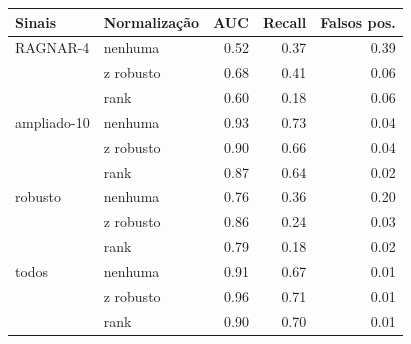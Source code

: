 \begin{tabular}{llrrr}
\toprule
Sinais & Normalização & AUC & Recall & Falsos pos. \\
\midrule
RAGNAR-4 & nenhuma & 0.52 & 0.37 & 0.39 \\
 & z robusto & 0.68 & 0.41 & 0.06 \\
 & rank & 0.60 & 0.18 & 0.06 \\
\addlinespace
ampliado-10 & nenhuma & 0.93 & 0.73 & 0.04 \\
 & z robusto & 0.90 & 0.66 & 0.04 \\
 & rank & 0.87 & 0.64 & 0.02 \\
\addlinespace
robusto & nenhuma & 0.76 & 0.36 & 0.20 \\
 & z robusto & 0.86 & 0.24 & 0.03 \\
 & rank & 0.79 & 0.18 & 0.02 \\
\addlinespace
todos & nenhuma & 0.91 & 0.67 & 0.01 \\
 & z robusto & 0.96 & 0.71 & 0.01 \\
 & rank & 0.90 & 0.70 & 0.01 \\
\bottomrule
\end{tabular}
